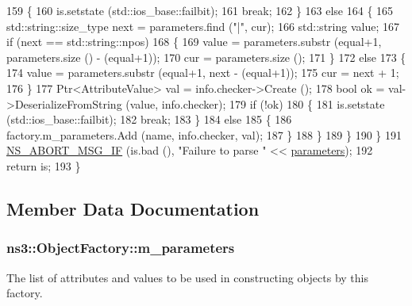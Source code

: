\begin{DoxyCode}
159             \{
160               is.setstate (std::ios\_base::failbit);
161               \textcolor{keywordflow}{break};
162             \}
163           \textcolor{keywordflow}{else}
164             \{
165               std::string::size\_type next = parameters.find (\textcolor{stringliteral}{"|"}, cur);
166               std::string value;
167               \textcolor{keywordflow}{if} (next == std::string::npos)
168                 \{
169                   value = parameters.substr (equal+1, parameters.size () - (equal+1));
170                   cur = parameters.size ();
171                 \}
172               \textcolor{keywordflow}{else}
173                 \{
174                   value = parameters.substr (equal+1, next - (equal+1));
175                   cur = next + 1;
176                 \}
177               Ptr<AttributeValue> val = info.checker->Create ();
178               \textcolor{keywordtype}{bool} ok = val->DeserializeFromString (value, info.checker);
179               \textcolor{keywordflow}{if} (!ok)
180                 \{
181                   is.setstate (std::ios\_base::failbit);
182                   \textcolor{keywordflow}{break};
183                 \}
184               \textcolor{keywordflow}{else}
185                 \{
186                   factory.m\_parameters.Add (name, info.checker, val);
187                 \}
188             \}
189         \}
190     \}
191   \hyperlink{group__fatal_ga6653324225bc139e46deea177614ceee}{NS\_ABORT\_MSG\_IF} (is.bad (), \textcolor{stringliteral}{"Failure to parse "} << \hyperlink{design_8txt_a61257d1df1c87e8bd4ba94cacb4982cf}{parameters});
192   \textcolor{keywordflow}{return} is;
193 \}
\end{DoxyCode}


\subsection{Member Data Documentation}
\subsubsection[{\texorpdfstring{m\+\_\+parameters}{m_parameters}}]{ ns3\+::\+Object\+Factory\+::m\+\_\+parameters\hspace{0.3cm}{\ttfamily [private]}}\hypertarget{classns3_1_1ObjectFactory_ad0f5d67c7039a3c60a80a0030bc9ca48}{}\label{classns3_1_1ObjectFactory_ad0f5d67c7039a3c60a80a0030bc9ca48}
The list of attributes and values to be used in constructing objects by this factory. 
